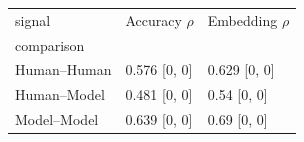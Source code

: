 \begin{tabular}{lll}
\toprule
signal & Accuracy $\rho$  & Embedding $\rho$  \\
comparison &  &  \\
\midrule
Human–Human & 0.576 [0, 0] & 0.629 [0, 0] \\
Human–Model & 0.481 [0, 0] & 0.54 [0, 0] \\
Model–Model & 0.639 [0, 0] & 0.69 [0, 0] \\
\bottomrule
\end{tabular}
